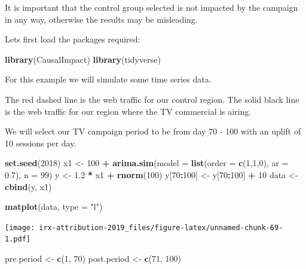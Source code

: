 \documentclass[]{book}
\newenvironment{Shaded}{\begin{snugshade}}{\end{snugshade}}
\newcommand{\KeywordTok}[1]{\textcolor[rgb]{0.13,0.29,0.53}{\textbf{#1}}}
\newcommand{\DataTypeTok}[1]{\textcolor[rgb]{0.13,0.29,0.53}{#1}}
\newcommand{\DecValTok}[1]{\textcolor[rgb]{0.00,0.00,0.81}{#1}}
\newcommand{\FloatTok}[1]{\textcolor[rgb]{0.00,0.00,0.81}{#1}}
\newcommand{\StringTok}[1]{\textcolor[rgb]{0.31,0.60,0.02}{#1}}
\newcommand{\OperatorTok}[1]{\textcolor[rgb]{0.81,0.36,0.00}{\textbf{#1}}}
\newcommand{\NormalTok}[1]{#1}
\begin{document}
It is important that the control group selected is not impacted by the
campaign in any way, otherwise the results may be misleading.

Lets first load the packages required:

\begin{Shaded}
\begin{Highlighting}[]
\KeywordTok{library}\NormalTok{(CausalImpact)}
\KeywordTok{library}\NormalTok{(tidyverse)}
\end{Highlighting}
\end{Shaded}

For this example we will simulate some time series data.

The red dashed line is the web traffic for our control region. The solid
black line is the web traffic for our region where the TV commercial is
airing.

We will select our TV campaign period to be from day 70 - 100 with an
uplift of 10 sessions per day.

\begin{Shaded}
\begin{Highlighting}[]
\KeywordTok{set.seed}\NormalTok{(}\DecValTok{2018}\NormalTok{)}
\NormalTok{x1 <-}\StringTok{ }\DecValTok{100} \OperatorTok{+}\StringTok{ }\KeywordTok{arima.sim}\NormalTok{(}\DataTypeTok{model =} \KeywordTok{list}\NormalTok{(}\DataTypeTok{order =} \KeywordTok{c}\NormalTok{(}\DecValTok{1}\NormalTok{,}\DecValTok{1}\NormalTok{,}\DecValTok{0}\NormalTok{), }\DataTypeTok{ar =} \FloatTok{0.7}\NormalTok{), }\DataTypeTok{n =} \DecValTok{99}\NormalTok{)}
\NormalTok{y <-}\StringTok{ }\FloatTok{1.2} \OperatorTok{*}\StringTok{ }\NormalTok{x1 }\OperatorTok{+}\StringTok{ }\KeywordTok{rnorm}\NormalTok{(}\DecValTok{100}\NormalTok{)}
\NormalTok{y[}\DecValTok{70}\OperatorTok{:}\DecValTok{100}\NormalTok{] <-}\StringTok{ }\NormalTok{y[}\DecValTok{70}\OperatorTok{:}\DecValTok{100}\NormalTok{] }\OperatorTok{+}\StringTok{ }\DecValTok{10}
\NormalTok{data <-}\StringTok{ }\KeywordTok{cbind}\NormalTok{(y, x1)}

\KeywordTok{matplot}\NormalTok{(data, }\DataTypeTok{type =} \StringTok{"l"}\NormalTok{)}
\end{Highlighting}
\end{Shaded}

\texttt{[image: irx-attribution-2019\_files/figure-latex/unnamed-chunk-69-1.pdf]}

\begin{Shaded}
\begin{Highlighting}[]
\NormalTok{pre.period <-}\StringTok{ }\KeywordTok{c}\NormalTok{(}\DecValTok{1}\NormalTok{, }\DecValTok{70}\NormalTok{)}
\NormalTok{post.period <-}\StringTok{ }\KeywordTok{c}\NormalTok{(}\DecValTok{71}\NormalTok{, }\DecValTok{100}\NormalTok{)}
\end{Highlighting}
\end{Shaded}
\end{document}
